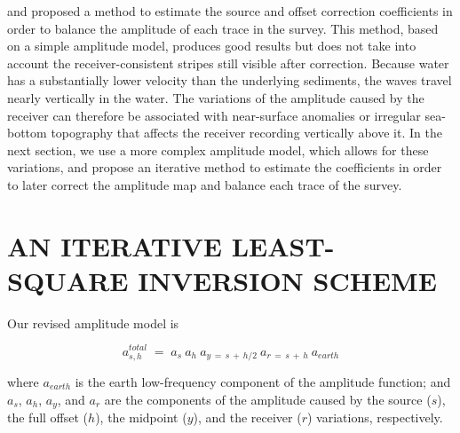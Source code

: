 

\par
\cite{Berlioux.sep.80.349} and \cite{Lumley.sep.84.125} proposed a method to estimate the source and 
offset correction coefficients in order to balance the amplitude of
each trace in the survey. This method, based on a simple amplitude
model, produces good results but does not take into account the
receiver-consistent stripes still visible after correction. Because
water has a substantially lower velocity than the underlying
sediments, the waves travel nearly vertically in the water. The
variations of the amplitude caused by the receiver can therefore be
associated with near-surface anomalies or irregular sea-bottom
topography that affects the receiver recording vertically above it. In
the next section, we use a more complex amplitude model, which allows
for these variations, and propose an iterative method to estimate the
coefficients in order to later correct the amplitude map and balance
each trace of the survey.


\section{AN ITERATIVE LEAST-SQUARE INVERSION SCHEME}
\par
Our revised amplitude model is

\begin{equation}
	a^{total}_{s,h} \; = \; a_{s} \: a_{h} \: a_{y \, = \, s \, + \, h/2} 
		\: a_{r \, = \, s \, + \, h} \: a_{earth}
\end{equation}

\noindent
where $a_{earth}$ is the earth low-frequency component of the amplitude 
function; and $a_{s}$, $a_{h}$, $a_{y}$, and $a_{r}$ are the components of 
the amplitude caused by the source ($s$), the full offset ($h$), the midpoint 
($y$), and the receiver ($r$) variations, respectively.

